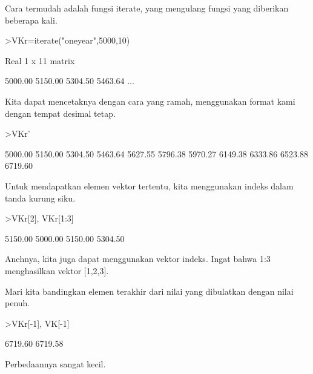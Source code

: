 \documentclass[a4paper,10pt]{article}
\begin{document}
\begin{eulernotebook}
\begin{eulercomment}
\begin{eulercomment}
\begin{eulercomment}
\begin{eulercomment}
\begin{eulercomment}
\begin{eulercomment}
\begin{eulercomment}
Cara termudah adalah fungsi iterate, yang mengulang fungsi yang
diberikan beberapa kali.
\end{eulercomment}
\begin{eulerprompt}
>VKr=iterate("oneyear",5000,10)
\end{eulerprompt}
\begin{euleroutput}
  Real 1 x 11 matrix
  
      5000.00     5150.00     5304.50     5463.64     ...
\end{euleroutput}
\begin{eulercomment}
Kita dapat mencetaknya dengan cara yang ramah, menggunakan format kami
dengan tempat desimal tetap.
\end{eulercomment}
\begin{eulerprompt}
>VKr'
\end{eulerprompt}
\begin{euleroutput}
      5000.00 
      5150.00 
      5304.50 
      5463.64 
      5627.55 
      5796.38 
      5970.27 
      6149.38 
      6333.86 
      6523.88 
      6719.60 
\end{euleroutput}
\begin{eulercomment}
Untuk mendapatkan elemen vektor tertentu, kita menggunakan indeks
dalam tanda kurung siku.
\end{eulercomment}
\begin{eulerprompt}
>VKr[2], VKr[1:3]
\end{eulerprompt}
\begin{euleroutput}
      5150.00 
      5000.00     5150.00     5304.50 
\end{euleroutput}
\begin{eulercomment}
Anehnya, kita juga dapat menggunakan vektor indeks. Ingat bahwa 1:3
menghasilkan vektor [1,2,3].

Mari kita bandingkan elemen terakhir dari nilai yang dibulatkan dengan
nilai penuh.
\end{eulercomment}
\begin{eulerprompt}
>VKr[-1], VK[-1]
\end{eulerprompt}
\begin{euleroutput}
      6719.60 
      6719.58 
\end{euleroutput}
\begin{eulercomment}
Perbedaannya sangat kecil.


\end{eulercomment}
\end{eulercomment}
\end{eulercomment}
\end{eulercomment}
\end{eulercomment}
\end{eulercomment}
\end{eulercomment}
\end{eulernotebook}
\end{document}
